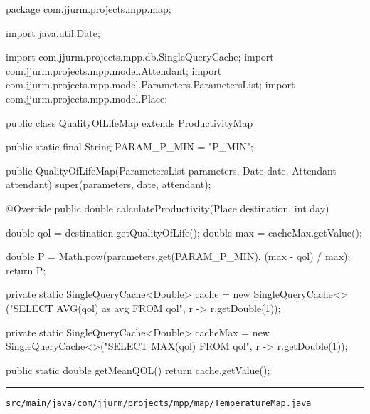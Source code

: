 \begin{javacode}
package com.jjurm.projects.mpp.map;

import java.util.Date;

import com.jjurm.projects.mpp.db.SingleQueryCache;
import com.jjurm.projects.mpp.model.Attendant;
import com.jjurm.projects.mpp.model.Parameters.ParametersList;
import com.jjurm.projects.mpp.model.Place;

public class QualityOfLifeMap extends ProductivityMap {

  public static final String PARAM_P_MIN = "P_MIN";

  public QualityOfLifeMap(ParametersList parameters, Date date, Attendant attendant) {
    super(parameters, date, attendant);
  }

  @Override
  public double calculateProductivity(Place destination, int day) {
    double qol = destination.getQualityOfLife();
    double max = cacheMax.getValue();

    double P = Math.pow(parameters.get(PARAM_P_MIN), (max - qol) / max);
    return P;
  }

  private static SingleQueryCache<Double> cache =
      new SingleQueryCache<>("SELECT AVG(qol) as avg FROM qol", r -> r.getDouble(1));

  private static SingleQueryCache<Double> cacheMax =
      new SingleQueryCache<>("SELECT MAX(qol) FROM qol", r -> r.getDouble(1));

  public static double getMeanQOL() {
    return cache.getValue();
  }

}
\end{javacode}

\noindent\rule{\textwidth}{0.4pt}

\nointerlineskip
\texttt{src/main/java/com/jjurm/projects/mpp/map/TemperatureMap.java}

